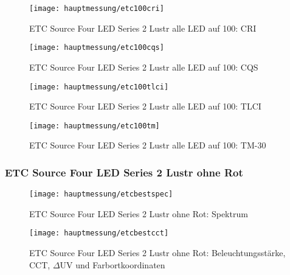 \documentclass[pagesize,paper=A4,fontsize=12pt,utf8,numbers=noenddot,bibliography=totoc,listof=totoc,DIV=11,BCOR=1mm]{scrreprt}
\begin{document}
\begin{figure}[htp]     %
\centering
\texttt{[image: hauptmessung/etc100cri]} 
\caption {ETC Source Four LED Series 2 Lustr alle LED auf 100: CRI} 
\end{figure}

\begin{figure}[htp]     %
\centering
\texttt{[image: hauptmessung/etc100cqs]} 
\caption {ETC Source Four LED Series 2 Lustr alle LED auf 100: CQS} 
\end{figure}

\begin{figure}[htp]     %
\centering
\texttt{[image: hauptmessung/etc100tlci]} 
\caption {ETC Source Four LED Series 2 Lustr alle LED auf 100: TLCI} 
\end{figure}

\begin{figure}[htp]     %
\centering
\texttt{[image: hauptmessung/etc100tm]} 
\caption {ETC Source Four LED Series 2 Lustr alle LED auf 100: TM-30} 
\end{figure}

\subsubsection{ETC Source Four LED Series 2 Lustr ohne Rot}

\begin{figure}[htp]     %
\centering
\texttt{[image: hauptmessung/etcbestspec]} 
\caption {ETC Source Four LED Series 2 Lustr ohne Rot: Spektrum} 
\end{figure}

\begin{figure}[htp]     %
\centering
\texttt{[image: hauptmessung/etcbestcct]} 
\caption {ETC Source Four LED Series 2 Lustr ohne Rot: Beleuchtungsstärke, CCT, $\Delta$UV und Farbortkoordinaten} 
\end{figure}
\end{document}
